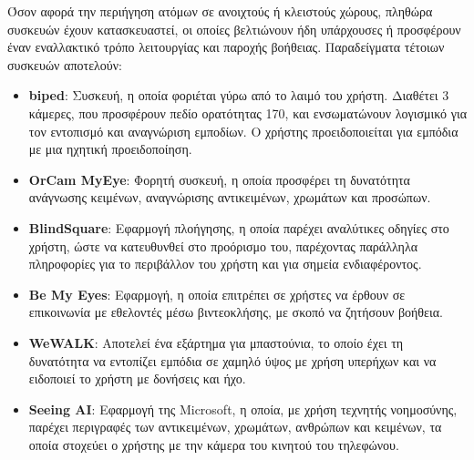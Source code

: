 Όσον αφορά την περιήγηση ατόμων σε ανοιχτούς ή κλειστούς χώρους, πληθώρα συσκευών έχουν κατασκευαστεί, οι οποίες βελτιώνουν ήδη υπάρχουσες ή προσφέρουν έναν εναλλακτικό τρόπο λειτουργίας και παροχής βοήθειας. Παραδείγματα τέτοιων συσκευών αποτελούν:
\begin{itemize}
  \item \textbf{biped}: Συσκευή, η οποία φοριέται γύρω από το λαιμό του χρήστη. Διαθέτει 3 κάμερες, που προσφέρουν πεδίο ορατότητας 170\textdegree, και ενσωματώνουν λογισμικό για τον εντοπισμό και αναγνώριση εμποδίων. Ο χρήστης προειδοποιείται για εμπόδια με μια ηχητική προειδοποίηση.~\cite{biped}
  \item \textbf{OrCam MyEye}: Φορητή συσκευή, η οποία προσφέρει τη δυνατότητα ανάγνωσης κειμένων, αναγνώρισης αντικειμένων, χρωμάτων και προσώπων.~\cite{ghebali_2023_orcam}
  \item \textbf{BlindSquare}: Εφαρμογή πλοήγησης, η οποία παρέχει αναλύτικες οδηγίες στο χρήστη, ώστε να κατευθυνθεί στο προόρισμο του, παρέχοντας παράλληλα πληροφορίες για το περιβάλλον του χρήστη και για σημεία ενδιαφέροντος.~\cite{blindsquare}
  \item \textbf{Be My Eyes}: Εφαρμογή, η οποία επιτρέπει σε χρήστες να έρθουν σε επικοινωνία με εθελοντές μέσω βιντεοκλήσης, με σκοπό να ζητήσουν βοήθεια.~\cite{a2019_be}
  \item \textbf{WeWALK}: Αποτελεί ένα εξάρτημα για μπαστούνια, το οποίο έχει τη δυνατότητα να εντοπίζει εμπόδια σε χαμηλό ύψος με χρήση υπερήχων και να ειδοποιεί το χρήστη με δονήσεις και ήχο.~\cite{wewalk}
  \item \textbf{Seeing AI}: Εφαρμογή της Microsoft, η οποία, με χρήση τεχνητής νοημοσύνης, παρέχει περιγραφές των αντικειμένων, χρωμάτων, ανθρώπων και κειμένων, τα οποία στοχεύει ο χρήστης με την κάμερα του κινητού του τηλεφώνου.~\cite{seeing}
\end{itemize}